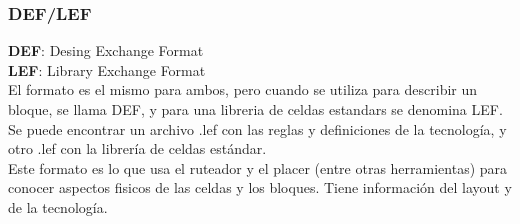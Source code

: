 \documentclass{beamer}
\begin{document}
\begin{frame}
\frametitle{DEF/LEF}

\textbf{DEF}: Desing Exchange Format \\
\textbf{LEF}: Library Exchange Format \\


El formato es el mismo para ambos, pero cuando se utiliza para describir un bloque, se llama DEF, y para una libreria de celdas estandars se denomina LEF.
Se puede encontrar un archivo .lef con las reglas y definiciones de la tecnolog\'ia, y otro .lef con la librer\'ia de celdas est\'andar.\\
Este formato es lo que usa el ruteador y el placer (entre otras herramientas) para conocer aspectos fisicos de las celdas y los bloques. Tiene informaci\'on del layout y de la tecnolog\'ia. 



\end{frame}

\begin{frame}
  \begin{figure}[ht]
      \centering
    \end{figure}
  
\end{frame}

\begin{frame}
  \begin{figure}[ht]
      \centering
    \end{figure}
  
\end{frame}
\end{document}
